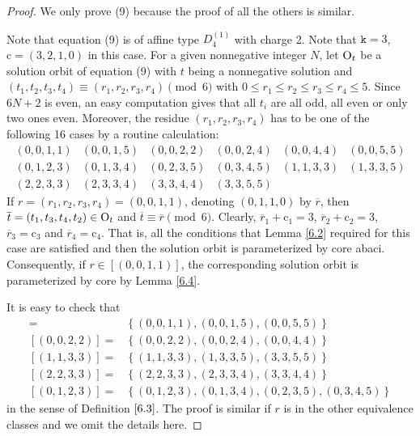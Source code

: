 \documentclass[11pt]{amsart}
\theoremstyle{plain}
\numberwithin{equation}{subsection}
\begin{document}
\begin{proof}
We only prove (9) because the proof of all the others is similar. 

Note that equation (9) is of affine type $D_4^{(1)}$ with charge 2. Note that $\mathtt{k}=3$, $\mathrm{c}=(3, 2, 1, 0)$ in this case.
For a given nonnegative integer $N$, let ${\rm O}_t$ be a solution orbit of equation (9) with $t$ being a nonnegative solution and 
$(t_1, t_2, t_3, t_4)\equiv (r_1, r_2, r_3, r_4) \pmod {6}$ with $0\leq r_1\leq r_2\leq r_3 \leq r_4\leq 5$. 
Since $6N+2$ is even, an easy computation gives that all $t_i$ are all odd, all even or only two ones even.
Moreover, the residue $(r_1, r_2, r_3, r_4)$ has to be one of the
following 16 cases by a routine calculation:
$$\begin{array}{cccccc}
  (0, 0, 1, 1) & (0, 0, 1, 5) & (0, 0, 2, 2) & (0, 0, 2, 4) & (0, 0, 4, 4) & (0, 0, 5, 5)\\ 
  (0, 1, 2, 3) & (0, 1, 3, 4) & (0, 2, 3, 5) & (0, 3, 4, 5) & (1, 1, 3, 3) & (1, 3, 3, 5)\\
  (2, 2, 3, 3) & (2, 3, 3, 4) & (3, 3, 4, 4) & (3, 3, 5, 5)
\end{array}$$
If $r=(r_1,r_2,r_3,r_4)=(0,0,1,1)$, denoting $(0, 1, 1, 0)$ by $\overline{r}$, then $\overline{t}=(t_1, t_3, t_4, t_2)\in {\rm O}_t$ and $\overline{t}\equiv \overline{r} \pmod 6$. 
Clearly, $\overline{r}_1+\mathrm{c}_1=3$, $\overline{r}_2+\mathrm{c}_2=3$, $\overline{r}_3=\mathrm{c}_3$ and $\overline{r}_4=\mathrm{c}_4$. 
That is, all the conditions that Lemma \ref{6.2} required for this case are satisfied and then the solution orbit is parameterized by core abaci.
Consequently, if $r\in [(0, 0, 1, 1)]$, the corresponding solution orbit is parameterized by core by Lemma \ref{6.4}.

It is easy to check that 
\begin{align*}
  [(0,0,1,1)] = & \left\{(0,0,1,1),(0,0,1,5),(0,0,5,5)\right\} \\
  [(0,0,2,2)] = & \left\{(0,0,2,2),(0,0,2,4),(0,0,4,4)\right\} \\
  [(1,1,3,3)] = & \left\{(1,1,3,3),(1,3,3,5),(3,3,5,5)\right\} \\
  [(2,2,3,3)] = & \left\{(2,2,3,3),(2,3,3,4),(3,3,4,4)\right\} \\
  [(0,1,2,3)] = & \left\{(0,1,2,3),(0,1,3,4),(0,2,3,5),(0,3,4,5)\right\}
\end{align*}
in the sense of Definition $\ref{6.3}$. 
The proof is similar if $r$ is in the other equivalence classes and we omit the details here.
\end{proof}
\end{document}
